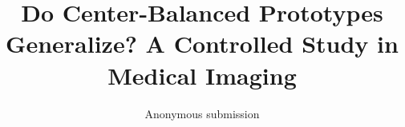 \documentclass[10pt,twocolumn,letterpaper]{article}
\title{Do Center-Balanced Prototypes Generalize? A Controlled Study in Medical Imaging}
\author{Anonymous submission}
\begin{document}
\maketitle







{
    \small
    
    
}
\end{document}
